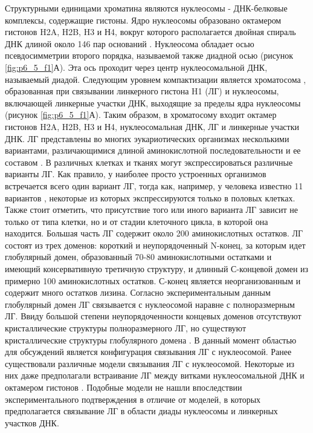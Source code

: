 Структурными единицами хроматина являются нуклеосомы - ДНК-белковые комплексы, содержащие гистоны. Ядро нуклеосомы образовано октамером гистонов H2A, H2B, H3 и Н4, вокруг которого располагается двойная спираль ДНК длиной около 146 пар оснований \cite{luger_crystal_1997}. Нуклеосома обладает осью псевдосимметрии второго порядка, называемой также диадной осью (рисунок \ref{fig:p6_5_f1}А). Эта ось проходит через центр нуклеосомальной ДНК, называемый диадой.
Следующим уровнем компактизации является хроматосома \cite{simpson_structure_1978}, образованная при связывании линкерного гистона H1 (ЛГ) и нуклеосомы, включающей линкерные участки ДНК, выходящие за пределы ядра нуклеосомы (рисунок \ref{fig:p6_5_f1}А). Таким образом, в хроматосому входит октамер гистонов H2A, H2B, H3 и Н4, нуклеосомальная ДНК, ЛГ  и линкерные участки ДНК. 
ЛГ представлены во многих эукариотических организмах несколькими вариантами, различающимися длиной аминокислотной последовательности и ее составом \cite{lyubitelev_structure_2016}. В различных клетках и тканях могут экспрессироваться различные варианты ЛГ. Как правило, у наиболее просто устроенных организмов встречается всего один вариант ЛГ, тогда как, например, у человека известно 11 вариантов \cite{el_kennani_ms_histonedb_2017}, некоторые из которых экспрессируются только в половых клетках. Также стоит отметить, что присутствие того или иного варианта ЛГ зависит не только от типа клетки, но и от стадии клеточного цикла, в которой она находится.
Большая часть ЛГ содержит около 200 аминокислотных остатков. ЛГ состоят из трех доменов: короткий и неупорядоченный N-конец, за которым идет глобулярный домен, образованный 70-80 аминокислотными остатками и имеющий консервативную третичную структуру, и длинный С-концевой домен из примерно 100 аминокислотных остатков. С-конец является неорганизованным и содержит много остатков лизина. Согласно экспериментальным данным \cite{syed_single-base_2010} глобулярный домен ЛГ связывается с нуклеосомой наравне с полноразмерным ЛГ. Ввиду большой степени неупорядоченности концевых доменов отсутствуют кристаллические структуры полноразмерного ЛГ, но существуют кристаллические структуры глобулярного домена \cite{ramakrishnan_crystal_1993}.
В данный момент областью для обсуждений является конфигурация связывания ЛГ с нуклеосомой. Ранее существовали различные модели связывания ЛГ с нуклеосомой. Некоторые из них даже предполагали встраивание ЛГ между витками нуклеосомальной ДНК и октамером гистонов \cite{pruss_asymmetric_1996}. Подобные модели не нашли впоследствии экспериментального подтверждения \cite{syed_single-base_2010,zhou_position_1998} в отличие от моделей, в которых предполагается связывание ЛГ в области диады нуклеосомы и линкерных участков ДНК. 
